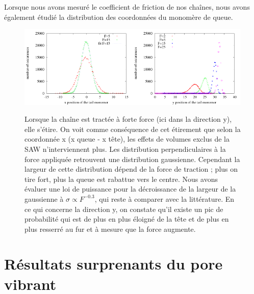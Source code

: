 \documentclass[a4paper,11pt]{article}
\begin{document}
Lorsque nous avons mesuré le coefficient de friction de nos chaînes, nous avons également étudié la distribution des coordonnées du monomère de queue.

\begin{figure}[H]
\begin{center}
\includegraphics[width=0.5\textwidth]{gausslateral.pdf}\includegraphics[width=0.5\textwidth]{ydistribtraction.pdf}

\caption{Lorsque la chaîne est tractée à forte force (ici dans la direction y), elle s'étire. On voit comme conséquence de cet étirement que selon la coordonnée x (x queue - x tête),  les effets de volumes exclus de la SAW n'interviennent plus. Les distribution perpendiculaires à la force appliquée retrouvent une distribution gaussienne. Cependant la largeur de cette distribution dépend de la force de traction ; plus on tire fort, plus la queue est rabattue vers le centre. Nous avons évaluer une loi de puissance pour la décroissance de la largeur de la gaussienne à $\sigma \propto F^{-0.3}$, qui reste à comparer avec la littérature. En ce qui concerne la direction y, on constate qu'il existe un pic de probabilité qui est de plus en plus éloigné de la tête et de plus en plus resserré au fur et à mesure que la force augmente. }
\label{traction}
\end{center}
\end{figure}

\section*{Résultats surprenants du pore vibrant}
\end{document}

